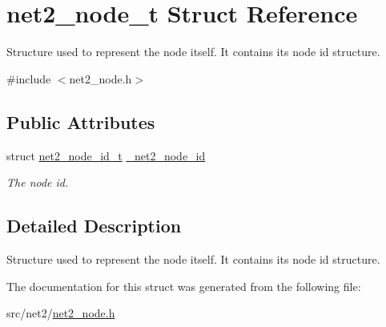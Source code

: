 \hypertarget{structnet2__node__t}{}\section{net2\+\_\+node\+\_\+t Struct Reference}
\label{structnet2__node__t}


Structure used to represent the node itself. It contains its node id structure.  




{\ttfamily \#include $<$net2\+\_\+node.\+h$>$}

\subsection*{Public Attributes}
\begin{DoxyCompactItemize}
\item 
\hypertarget{structnet2__node__t_a9ff8fd051476d5c5d9c46d8ee3fbe466}{}struct \hyperlink{structnet2__node__id__t}{net2\+\_\+node\+\_\+id\+\_\+t} \hyperlink{structnet2__node__t_a9ff8fd051476d5c5d9c46d8ee3fbe466}{\+\_\+net2\+\_\+node\+\_\+id}\label{structnet2__node__t_a9ff8fd051476d5c5d9c46d8ee3fbe466}

\begin{DoxyCompactList}\small\item\em The node id. \end{DoxyCompactList}\end{DoxyCompactItemize}


\subsection{Detailed Description}
Structure used to represent the node itself. It contains its node id structure. 

The documentation for this struct was generated from the following file\+:\begin{DoxyCompactItemize}
\item 
src/net2/\hyperlink{net2__node_8h}{net2\+\_\+node.\+h}\end{DoxyCompactItemize}
